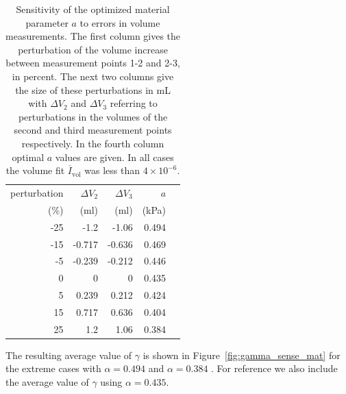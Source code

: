 \begin{table}
\caption{Sensitivity of the optimized material parameter $a$ to errors in volume measurements.
The first column gives the perturbation of the volume increase 
between measurement points 1-2 and 2-3, in percent. 
The next two columns give the size of these perturbations in mL with $\Delta V_2$ 
and $\Delta V_3$ referring to perturbations in the 
volumes of the second and third measurement points respectively. In the fourth column 
optimal $a$ values are given. In all cases 
the volume fit $\overline{I}_{\mathrm{vol}}$ was less than $4 \times 10^{-6}$.}
\begin{tabular}{rrrrr}
\hline
	 perturbation  &   $\Delta V_2$ &   $\Delta V_3$ &      $a$ \\
                ($\%$) &   (ml) &   (ml) &      (kPa) \\
\hline
                   -25 &              -1.2   &              -1.06  &    0.494 \\
                   -15 &              -0.717 &              -0.636 &    0.469 \\
                    -5 &              -0.239 &              -0.212 &    0.446 \\
                     0 &               0     &               0     &    0.435 \\
                     5 &               0.239 &               0.212 &    0.424 \\
                    15 &               0.717 &               0.636 &    0.404 \\
                    25 &               1.2   &               1.06  &    0.384 \\
\hline
\end{tabular}
\label{tab:passive_synth_opt}
\end{table}

The resulting average value of $\gamma$ is shown in
Figure~\ref{fig:gamma_sense_mat} for the extreme cases
with $\alpha = 0.494$ and $\alpha = 0.384$ . For reference we also include the
average value of $\gamma$ using $\alpha = 0.435$.
 
